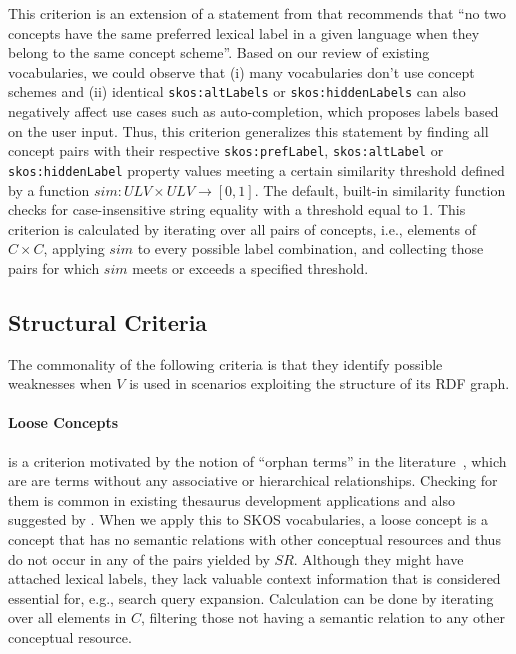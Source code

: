 This criterion is an extension of a statement from \cite{Isaac2009} that recommends that ``no two concepts have the same preferred lexical label in a given language when they belong to the same concept scheme''. Based on our review of existing vocabularies, we could observe that (i) many vocabularies don’t use concept schemes and (ii) identical \texttt{skos:altLabels} or \texttt{skos:hiddenLabels} can also negatively affect use cases such as auto-completion, which proposes labels based on the user input. Thus, this criterion generalizes this statement by finding all concept pairs with their respective \texttt{skos:prefLabel}, \texttt{skos:altLabel} or \texttt{skos:hiddenLabel} property values meeting a certain similarity threshold defined by a function $sim:ULV \times ULV \rightarrow [0,1]$. The default, built-in similarity function checks for case-insensitive string equality with a threshold equal to 1. This criterion is calculated by iterating over all pairs of concepts, i.e., elements of $C \times C$, applying $sim$ to every possible label combination, and collecting those pairs for which $sim$ meets or exceeds a specified threshold.  


\subsection{Structural Criteria}

The commonality of the following criteria is that they identify possible weaknesses when $V$ is used in scenarios exploiting the structure of its RDF graph. 

\paragraph{Loose Concepts} 

is a criterion motivated by the notion of ``orphan terms'' in the literature~\cite{Hedden2010}, which are are terms without any associative or hierarchical relationships. Checking for them is common in existing thesaurus development applications and also suggested by \cite{Z39.19:2005}. When we apply this to SKOS vocabularies, a loose concept is a concept that has no semantic relations with other conceptual resources and thus do not occur in any of the pairs yielded by $SR$. Although they might have attached lexical labels, they lack valuable context information that is considered essential for, e.g., search query expansion. Calculation can be done by iterating over all elements in $C$, filtering those not having a semantic relation to any other conceptual resource. 

